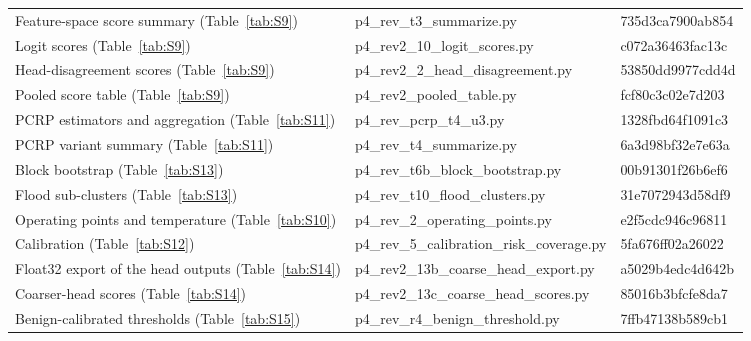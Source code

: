 \documentclass[10pt,a4paper]{article}
\begin{document}
\begin{center}
\begin{tabular}{p{4.9cm}p{6.6cm}l}
Feature-space score summary (Table~\ref{tab:S9}) & p4\_rev\_t3\_summarize.py & 735d3ca7900ab854 \\
Logit scores (Table~\ref{tab:S9}) & p4\_rev2\_10\_logit\_scores.py & c072a36463fac13c \\
Head-disagreement scores (Table~\ref{tab:S9}) & p4\_rev2\_2\_head\_disagreement.py & 53850dd9977cdd4d \\
Pooled score table (Table~\ref{tab:S9}) & p4\_rev2\_pooled\_table.py & fcf80c3c02e7d203 \\
PCRP estimators and aggregation (Table~\ref{tab:S11}) & p4\_rev\_pcrp\_t4\_u3.py & 1328fbd64f1091c3 \\
PCRP variant summary (Table~\ref{tab:S11}) & p4\_rev\_t4\_summarize.py & 6a3d98bf32e7e63a \\
Block bootstrap (Table~\ref{tab:S13}) & p4\_rev\_t6b\_block\_bootstrap.py & 00b91301f26b6ef6 \\
Flood sub-clusters (Table~\ref{tab:S13}) & p4\_rev\_t10\_flood\_clusters.py & 31e7072943d58df9 \\
Operating points and temperature (Table~\ref{tab:S10}) & p4\_rev\_2\_operating\_points.py & e2f5cdc946c96811 \\
Calibration (Table~\ref{tab:S12}) & p4\_rev\_5\_calibration\_risk\_coverage.py & 5fa676ff02a26022 \\
Float32 export of the head outputs (Table~\ref{tab:S14}) & p4\_rev2\_13b\_coarse\_head\_export.py & a5029b4edc4d642b \\
Coarser-head scores (Table~\ref{tab:S14}) & p4\_rev2\_13c\_coarse\_head\_scores.py & 85016b3bfcfe8da7 \\
Benign-calibrated thresholds (Table~\ref{tab:S15}) & p4\_rev\_r4\_benign\_threshold.py & 7ffb47138b589cb1 \\
\bottomrule
\end{tabular}
\end{center}
\end{document}
